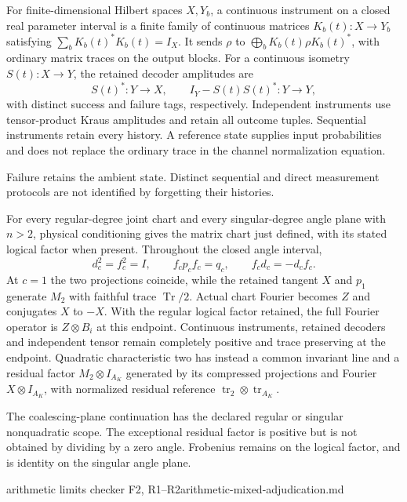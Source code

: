 \begin{definition}
\leavevmode\par
For finite-dimensional Hilbert spaces $X,Y_b$, a continuous instrument
on a closed real parameter interval is a finite family of continuous
matrices $K_b(t):X\to Y_b$ satisfying $\sum_bK_b(t)^*K_b(t)=I_X$.
It sends $\rho$ to $\bigoplus_bK_b(t)\rho K_b(t)^*$, with ordinary matrix
traces on the output blocks. For a continuous isometry $S(t):X\to Y$,
the retained decoder amplitudes are
\[ S(t)^*:Y\to X,\qquad I_Y-S(t)S(t)^*:Y\to Y, \]
with distinct success and failure tags, respectively.
Independent instruments use tensor-product Kraus amplitudes and retain all
outcome tuples. Sequential instruments retain every history. A reference
state supplies input probabilities and does not replace the ordinary
trace in the channel normalization equation.
\end{definition}
\begin{scope}
Failure retains the ambient state. Distinct sequential and direct
measurement protocols are not identified by forgetting their histories.
\end{scope}

\begin{proposition}
\statusProved\par
For every regular-degree joint chart and every singular-degree angle plane
with $n>2$, physical conditioning gives the matrix chart just defined,
with its stated logical factor when present. Throughout the closed angle
interval,
\[
 d_c^2=f_c^2=I,\qquad f_cp_cf_c=q_c,\qquad f_cd_c=-d_cf_c.
\]
At $c=1$ the two projections coincide, while the retained tangent $X$
and $p_1$ generate $M_2$ with faithful trace $\operatorname{Tr}/2$.
Actual chart Fourier becomes $Z$ and conjugates $X$ to $-X$.
With the regular logical factor retained, the full Fourier operator is
$Z\otimes B_i$ at this endpoint.
Continuous instruments, retained decoders and independent tensor remain
completely positive and trace preserving at the endpoint.
Quadratic characteristic two has instead a common invariant line and a
residual factor $M_2\otimes I_{A_K}$ generated by its compressed projections
and Fourier $X\otimes I_{A_K}$, with normalized residual reference
$\operatorname{tr}_2\otimes\operatorname{tr}_{A_K}$.
\end{proposition}
\begin{scope}
The coalescing-plane continuation has the declared regular or singular
nonquadratic scope. The exceptional residual factor is positive but is
not obtained by dividing by a zero angle. Frobenius remains on the
logical factor, and is identity on the singular angle plane.
\end{scope}
{arithmetic limits checker F2, R1--R2}{arithmetic-mixed-adjudication.md}

